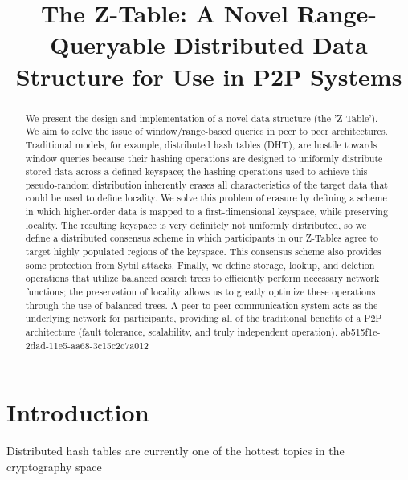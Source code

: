 \documentclass[12pt]{article}
\title{The Z-Table: A Novel Range-Queryable Distributed Data Structure for Use in P2P Systems}
\begin{document}
\maketitle

\begin{abstract}
We present the design and implementation of a novel data structure (the 'Z-Table'). We aim to solve the issue of window/range-based queries in peer to peer architectures. Traditional models, for example,  distributed hash tables (DHT), are hostile towards window queries because their hashing operations are designed to uniformly distribute stored data across a defined keyspace; the hashing operations used to achieve this pseudo-random distribution inherently erases all characteristics of the target data that could be used to define locality. We solve this problem of erasure by defining a scheme in which higher-order data is mapped to a first-dimensional keyspace, while preserving locality. The resulting keyspace is very definitely not uniformly distributed, so we define a distributed consensus scheme in which participants in our Z-Tables agree to target highly populated regions of the keyspace. This consensus scheme also provides some protection from Sybil attacks. Finally, we define storage, lookup, and deletion operations that utilize balanced search trees to efficiently perform necessary network functions; the preservation of locality allows us to greatly optimize these operations through the use of balanced trees. A peer to peer communication system acts as the underlying network for participants, providing all of the traditional benefits of a P2P architecture (fault tolerance, scalability, and truly independent operation).
ab515f1e-2dad-11e5-aa68-3c15c2c7a012\end{abstract}


\newpage
\section{Introduction}
Distributed hash tables are currently one of the hottest topics in the cryptography space~\cite{Stoica:2001dj,Rowstron:2001ea,Ratnasamy:2001wn}

\printbibliography
\end{document}
